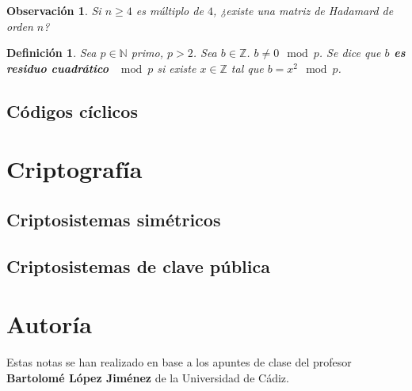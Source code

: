 \documentclass[spanish]{book}
\newtheorem{mydef}{Definición}
\newtheorem{obsv}{Observación}
\begin{document}
\begin{obsv}
	Si $n\geq 4$ es múltiplo de $4$, ¿existe una matriz de Hadamard de orden $n$?
\end{obsv}

\begin{mydef}
	Sea $p \in \mathbb{N}$ primo, $p>2$. Sea $b \in \mathbb{Z}$. $b \neq 0 \mod p$. Se dice que \textbf{$b$ es residuo cuadrático $\mod p$} si existe $x \in \mathbb{Z}$ tal que $b = x^2 \mod p$.
\end{mydef}
\section{Códigos cíclicos}

\chapter{Criptografía}
\section{Criptosistemas simétricos}
\section{Criptosistemas de clave pública}

\chapter*{Autoría}
Estas notas se han realizado en base a los apuntes de clase del profesor \textbf{Bartolomé López Jiménez} de la Universidad de Cádiz.
\end{document}

